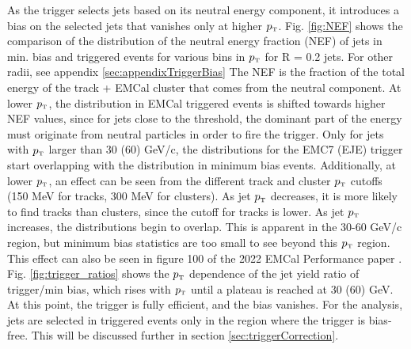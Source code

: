 \documentclass[ALICE]{ALICE_analysis_notes}
\newcommand{\pT}{$p_{\mbox{\tiny T}}$\xspace}
\begin{document}
As the trigger selects jets based on its neutral energy component, it introduces a bias on the selected jets that vanishes only at higher \pT. Fig. \ref{fig:NEF} shows the comparison of the distribution of the neutral energy fraction (NEF) of jets in min. bias and triggered events for various bins in \pT for R = 0.2 jets. For other radii, see appendix \ref{sec:appendixTriggerBias} The NEF is the fraction of the total energy of the track + EMCal cluster that comes from the neutral component. At lower \pT, the distribution in EMCal triggered events is shifted towards higher NEF values, since for jets close to the threshold, the dominant part of the energy must originate from neutral particles in order to fire the trigger. Only for jets with \pT larger than 30 (60) GeV/c, the distributions for the EMC7 (EJE) trigger start overlapping with the distribution in minimum bias events. Additionally, at lower \pT, an effect can be seen from the different track and cluster \pT cutoffs (150 MeV for tracks, 300 MeV for clusters). As jet \pT decreases, it is more likely to find tracks than clusters, since the cutoff for tracks is lower. As jet \pT increases, the distributions begin to overlap. This is apparent in the 30-60 GeV/c region, but minimum bias statistics are too small to see beyond this \pT region. This effect can also be seen in figure 100 of the 2022 EMCal Performance paper \cite{EMCalPerformance}. Fig. \ref{fig:trigger_ratios} shows the \pT dependence of the jet yield ratio of trigger/min bias, which rises with \pT until a plateau is reached at 30 (60) GeV. At this point, the trigger is fully efficient, and the bias vanishes. For the analysis, jets are selected in triggered events only in the region where the trigger is bias-free. This will be discussed further in section \ref{sec:triggerCorrection}.
\end{document}
